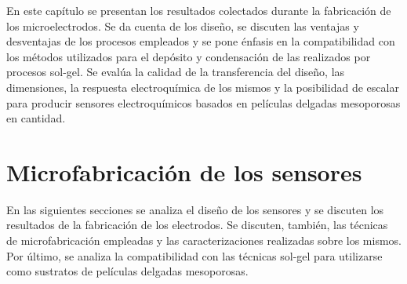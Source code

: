 	En este capítulo se presentan los resultados colectados durante la fabricación de los microelectrodos. Se da cuenta de los diseño, se discuten las ventajas y desventajas de los procesos empleados y se pone énfasis en la compatibilidad con los métodos utilizados para el depósito y condensación de las \pdm\space realizados por procesos sol-gel. Se evalúa la calidad de la transferencia del diseño, las dimensiones, la respuesta electroquímica de los mismos y la posibilidad de escalar para producir sensores electroquímicos basados en películas delgadas mesoporosas en cantidad.



	
\section{Microfabricación de los sensores}\label{sec:microfabricaci_n_de_los_sensores}
		
	 	 En las siguientes secciones se analiza el diseño de los sensores y se discuten los resultados de la fabricación de los electrodos. Se discuten, también, las técnicas de microfabricación empleadas y las caracterizaciones realizadas sobre los mismos. Por último, se analiza la compatibilidad con las técnicas sol-gel para utilizarse como sustratos de películas delgadas mesoporosas.

